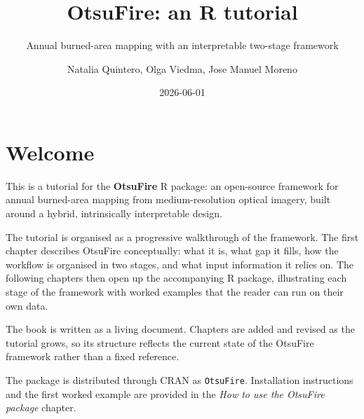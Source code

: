 \documentclass[
  british,
  a4paper,
]{scrbook}
\title{OtsuFire: an R tutorial}
\subtitle{Annual burned-area mapping with an interpretable two-stage
framework}
\author{Natalia Quintero, Olga Viedma, Jose Manuel Moreno}
\date{2026-06-01}
\renewcommand*\contentsname{Table of contents}
\newcommand\contentsname{Table of contents}
\begin{document}
\frontmatter
\maketitle

\renewcommand*\contentsname{Table of contents}
{
\setcounter{tocdepth}{2}
\tableofcontents
}

\mainmatter
{}

\chapter*{Welcome}\label{welcome}


This is a tutorial for the \textbf{OtsuFire} R package: an open-source
framework for annual burned-area mapping from medium-resolution optical
imagery, built around a hybrid, intrinsically interpretable design.

The tutorial is organised as a progressive walkthrough of the framework.
The first chapter describes OtsuFire conceptually: what it is, what gap
it fills, how the workflow is organised in two stages, and what input
information it relies on. The following chapters then open up the
accompanying R package, illustrating each stage of the framework with
worked examples that the reader can run on their own data.

The book is written as a living document. Chapters are added and revised
as the tutorial grows, so its structure reflects the current state of
the OtsuFire framework rather than a fixed reference.

\begin{tcolorbox}[enhanced jigsaw, arc=.35mm, bottomrule=.15mm, bottomtitle=1mm, breakable, colback=white, colbacktitle=quarto-callout-note-color!10!white, colframe=quarto-callout-note-color-frame, coltitle=black, left=2mm, leftrule=.75mm, opacityback=0, opacitybacktitle=0.6, rightrule=.15mm, title=\textcolor{quarto-callout-note-color}{\faInfo}\hspace{0.5em}{Note}, titlerule=0mm, toprule=.15mm, toptitle=1mm]

The package is distributed through CRAN as \texttt{OtsuFire}.
Installation instructions and the first worked example are provided in
the \emph{How to use the OtsuFire package} chapter.

\end{tcolorbox}

\end{document}
